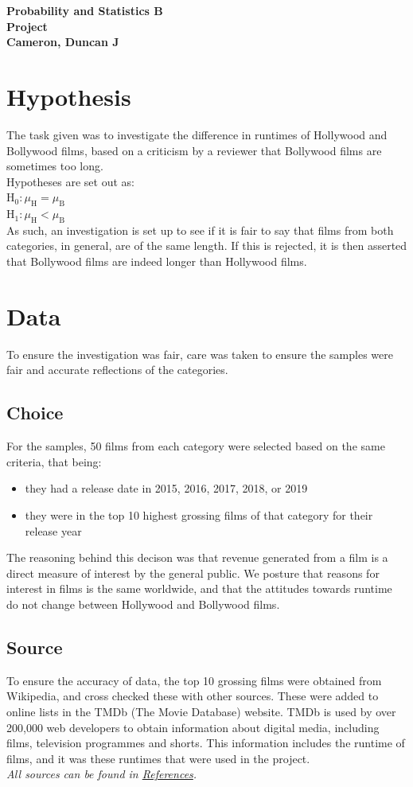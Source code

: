 \documentclass{article}
\begin{document}
\begin{center}
\textbf{\huge Probability and Statistics B}\\
\textbf{\LARGE Project}\\
\textbf{\large Cameron, Duncan J}\\
\end{center}
\tableofcontents
\newpage
{}
\section{Hypothesis}
The task given was to investigate the difference in runtimes of Hollywood and Bollywood films, based on a criticism by a reviewer that Bollywood films are sometimes too long.\\
Hypotheses are set out as:\\
H$_\text{0}:\mu_\text{H}=\mu_\text{B}$\\
H$_\text{1}:\mu_\text{H}<\mu_\text{B}$\\
As such, an investigation is set up to see if it is fair to say that films from both categories, in general, are of the same length. If this is rejected, it is then asserted that Bollywood films are indeed longer than Hollywood films.
\section{Data}
To ensure the investigation was fair, care was taken to ensure the samples were fair and accurate reflections of the categories.
\subsection{Choice}
For the samples, 50 films from each category were selected based on the same criteria, that being:
\begin{itemize}
\item they had a release date in 2015, 2016, 2017, 2018, or 2019
\item they were in the top 10 highest grossing films of that category for their release year
\end{itemize}
The reasoning behind this decison was that revenue generated from a film is a direct measure of interest by the general public. We posture that reasons for interest in films is the same worldwide, and that the attitudes towards runtime do not change between Hollywood and Bollywood films.
\subsection{Source}
To ensure the accuracy of data, the top 10 grossing films were obtained from Wikipedia, and cross checked these with other sources. These were added to online lists in the TMDb (The Movie Database) website. TMDb is used by over 200,000 web developers to obtain information about digital media, including films, television programmes and shorts. This information includes the runtime of films, and it was these runtimes that were used in the project.\\
\textit{All sources can be found in \hyperref[sec:ref]{References}.}
\end{document}
